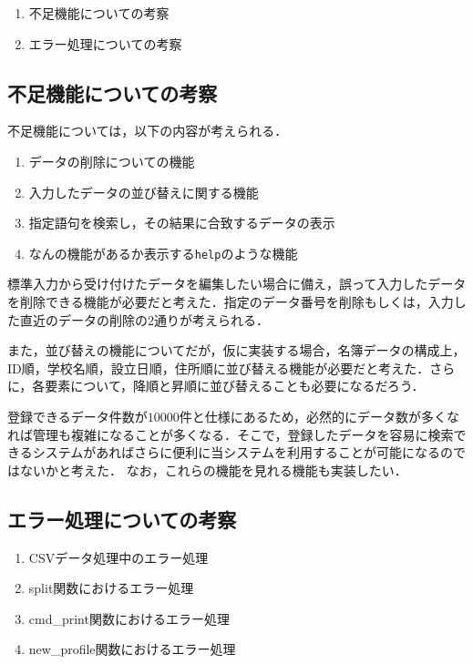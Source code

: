 \documentclass[a4j,11pt]{jarticle}
\begin{document}
\begin{enumerate}
\setlength{\parskip}{2pt} \setlength{\itemsep}{2pt}
    \item 不足機能についての考察
    \item エラー処理についての考察
\end{enumerate}

\subsection{不足機能についての考察}
不足機能については，以下の内容が考えられる．
\begin{enumerate}
\setlength{\parskip}{2pt} \setlength{\itemsep}{2pt}
    \item データの削除についての機能
    \item 入力したデータの並び替えに関する機能
　　\item 指定語句を検索し，その結果に合致するデータの表示
　　\item なんの機能があるか表示する\verb|help|のような機能
\end{enumerate}
標準入力から受け付けたデータを編集したい場合に備え，誤って入力したデータを削除できる機能が必要だと考えた．指定のデータ番号を削除もしくは，入力した直近のデータの削除の2通りが考えられる．

また，並び替えの機能についてだが，仮に実装する場合，名簿データの構成上，ID順，学校名順，設立日順，住所順に並び替える機能が必要だと考えた．さらに，各要素について，降順と昇順に並び替えることも必要になるだろう．

登録できるデータ件数が$10000$件と仕様にあるため，必然的にデータ数が多くなれば管理も複雑になることが多くなる．そこで，登録したデータを容易に検索できるシステムがあればさらに便利に当システムを利用することが可能になるのではないかと考えた．
なお，これらの機能を見れる機能も実装したい．

\subsection{エラー処理についての考察}
\begin{enumerate}
\setlength{\parskip}{2pt} \setlength{\itemsep}{2pt}
    \item CSVデータ処理中のエラー処理
    \item split関数におけるエラー処理
　　\item cmd\_print関数におけるエラー処理
    \item new\_profile関数におけるエラー処理
\end{enumerate}
\end{document}
